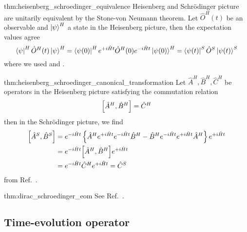 \begin{delayedproof}{thm:heisenberg_schroedinger_equivalence}
	Heisenberg and Schrödinger picture are unitarily equivalent by the Stone-von Neumann theorem.
	Let $\hat{O}^H(t)$ be an observable and $\ket{\psi}^H$ a state in the Heisenberg picture, then the expectation values agree
	\begin{equation*}
		\bra{\psi}^H
		\hat{O}^H(t)
		\ket{\psi}^H
		=
		\bra{\psi(0)}^H
		e^{+i\hat{H}t}
		\hat{O}^H(0)
		e^{-i\hat{H}t}
		\ket{\psi(0)}^H
		=
		\bra{\psi(t)}^S
		\hat{O}^S
		\ket{\psi(t)}^S
	\end{equation*}
	where we used  and .
\end{delayedproof}
\begin{delayedproof}{thm:heisenberg_schroedinger_canonical_transformation}
	Let $\hat{A}^H,\hat{B}^H,\hat{C}^H$ be operators in the Heisenberg picture satisfying the commutation relation
	\begin{equation*}
		\comm{\hat{A}^H}{\hat{B}^H}
		=
		\hat{C}^H
	\end{equation*}
	then in the Schrödinger picture, we find
	\begin{equation*}
		\begin{split}
			\comm{\hat{A}^S}{\hat{B}^S}
			&=
			e^{-i\hat{H}t}
			\left\{
				\hat{A}^H
				e^{+i\hat{H}t}
				e^{-i\hat{H}t}
				\hat{B}^H
				-	
				\hat{B}^H
				e^{-i\hat{H}t}
				e^{+i\hat{H}t}
				\hat{A}^H
			\right\}
			e^{+i\hat{H}t}
			\\
			&=
			e^{-i\hat{H}t}
			\comm{\hat{A}^H}{\hat{B}^H}
			e^{+i\hat{H}t}
			\\
			&=
			e^{-i\hat{H}t}
			\hat{C}^H
			e^{+i\hat{H}t}
			=
			\hat{C}^S
		\end{split}
	\end{equation*}
	from Ref.~\cite[p.~213]{Greiner2013}.
\end{delayedproof}
\begin{delayedproof}{thm:dirac_schroedinger_eom}
	See Ref.~\cite[p.~214]{Greiner2013}.
\end{delayedproof}

\subsection{Time-evolution operator}

